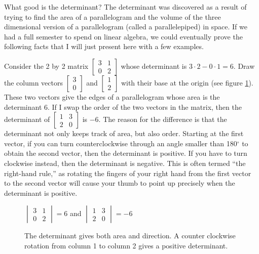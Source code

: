What good is the determinant?  
The determinant was discovered as a result of trying to find the area of a parallelogram and the volume of the three dimensional version of a parallelogram (called a parallelepiped) in space. 
If we had a full semester to spend on linear algebra, we could eventually prove the following facts that I will just present here with a few examples.

Consider the 2 by 2 matrix $\begin{bmatrix}3&1\\0&2\end{bmatrix}$ whose determinant is $3\cdot 2-0\cdot 1=6$. Draw the column vectors $\begin{bmatrix}3\\0\end{bmatrix}$ and $\begin{bmatrix}1\\2\end{bmatrix}$ with their base at the origin (see figure \ref{detfig}). 
These two vectors give the edges of a parallelogram whose area is the determinant $6$.  If I swap the order of the two vectors in the matrix, then the determinant of $\begin{bmatrix}1&3\\2&0\end{bmatrix}$ is $-6$.  The reason for the difference is that the determinant not only keeps track of area, but also order. Starting at the first vector, if you can turn counterclockwise through an angle smaller than 180$^\circ$ to obtain the second vector, then the determinant is positive.  If you have to turn clockwise instead, then the determinant is negative.  This is often termed ``the right-hand rule,'' as rotating the fingers of your right hand from the first vector to the second vector will cause your thumb to point up precisely when the determinant is positive.
\begin{figure}[h]
\begin{center}

\vspace{2pt}
$\begin{vmatrix}{3}&{1}\\{0}&{2}\end{vmatrix}=6$ and $\begin{vmatrix}{1}&{3}\\{2}&0\end{vmatrix}=-6$
\end{center}
\caption{The determinant gives both area and direction. A counter clockwise rotation from column 1 to column 2 gives a positive determinant.\label{detfig}}
\end{figure}
